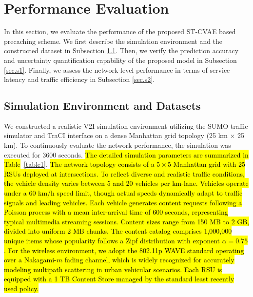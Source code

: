 \documentclass[journal]{IEEEtran}
\begin{document}
\section{Performance Evaluation} \label{sec.s}
In this section, we evaluate the performance of the proposed ST-CVAE based precaching scheme.
We first describe the simulation environment and the constructed dataset in Subsection \ref{sec.s0}.
Then, we verify the prediction accuracy and uncertainty quantification capability of the proposed model in Subsection \ref{sec.s1}.
Finally, we assess the network-level performance in terms of service latency and traffic efficiency in Subsection \ref{sec.s2}.

\subsection{Simulation Environment and Datasets} \label{sec.s0}
We constructed a realistic V2I simulation environment utilizing the SUMO traffic simulator and TraCI interface on a dense Manhattan grid topology (25 km $\times$ 25 km).
To continuously evaluate the network performance, the simulation was executed for 3600 seconds.
\hl{The detailed simulation parameters are summarized in Table}~\ref{table1}.
\hl{The network topology consists of a $5 \times 5$ Manhattan grid with 25 RSUs deployed at intersections.
To reflect diverse and realistic traffic conditions, the vehicle density varies between 5 and 20 vehicles per km-lane.
Vehicles operate under a 60 km/h speed limit, though actual speeds dynamically adapt to traffic signals and leading vehicles.
Each vehicle generates content requests following a Poisson process with a mean inter-arrival time of 600 seconds, representing typical multimedia streaming sessions.
Content sizes range from 150 MB to 2 GB, divided into uniform 2 MB chunks.
The content catalog comprises 1,000,000 unique items whose popularity follows a Zipf distribution with exponent $\alpha=0.75$.
For the wireless environment, we adopt the 802.11p WAVE standard operating over a Nakagami-$m$ fading channel, which is widely recognized for accurately modeling multipath scattering in urban vehicular scenarios.
Each RSU is equipped with a 1 TB Content Store managed by the standard least recently used policy.}
\end{document}
